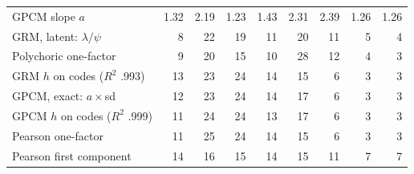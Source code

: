 \begin{center}
\begin{tabular}{@{}lrrrrrrrr@{}}
GPCM slope $a$ & 1.32 & 2.19 & 1.23 & 1.43 & 2.31 & 2.39 & 1.26 & 1.26 \\
GRM, latent: $\lambda/\psi$ & 8 & 22 & 19 & 11 & 20 & 11 & 5 & 4 \\
Polychoric one-factor & 9 & 20 & 15 & 10 & 28 & 12 & 4 & 3 \\
GRM $h$ on codes ($R^2$ .993) & 13 & 23 & 24 & 14 & 15 & 6 & 3 & 3 \\
GPCM, exact: $a\times$sd & 12 & 23 & 24 & 14 & 17 & 6 & 3 & 3 \\
GPCM $h$ on codes ($R^2$ .999) & 11 & 24 & 24 & 13 & 17 & 6 & 3 & 3 \\
Pearson one-factor & 11 & 25 & 24 & 14 & 15 & 6 & 3 & 3 \\
Pearson first component & 14 & 16 & 15 & 14 & 15 & 11 & 7 & 7 \\
\bottomrule
\end{tabular}
\end{center}
